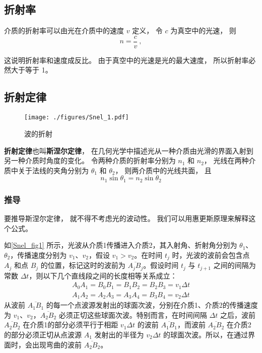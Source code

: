 
\subsection{折射率}
介质的折射率可以由光在介质中的速度 $v$ 定义， 令 $c$ 为真空中的光速， 则
\begin{equation}
n = \frac{c}{v}~,
\end{equation} 

这说明折射率和速度成反比。 由于真空中的光速是光的最大速度， 所以折射率必然大于等于 1。

\subsection{折射定律}
\begin{figure}[ht]
\centering
\texttt{[image: ./figures/Snel\_1.pdf]}
\caption{波的折射} \label{Snel_fig1}
\end{figure}
\textbf{折射定律}也叫\textbf{斯涅尔定律}， 在几何光学中描述光从一种介质由光滑的界面入射到另一种介质时角度的变化。 令两种介质的折射率分别为 $n_1$ 和 $n_2$， 光线在两种介质中关于法线的夹角分别为 $\theta_1$ 和 $\theta_2$， 则两介质中的光线共面， 且
\begin{equation}
n_1 \sin\theta_1 = n_2 \sin\theta_2
\end{equation}


\subsubsection{推导}
要推导斯涅尔定律， 就不得不考虑光的波动性。 我们可以用惠更斯原理来解释这个公式。

如\autoref{Snel_fig1} 所示，光波从介质1传播进入介质2，其入射角、折射角分别为 $\theta_1$、$\theta_2$，传播速度分别为 $v_1$、$v_2$，假设 $v_1>v_2$。在时间 $t_{j}$ 时，光波的波前会包含点 $A_{j}$ 和点 $B_{j}$ 的位置，标记这时的波前为 $\overline {A_{j}B_{j}}$。假设时间 $t_{j}$ 与 $t_{{j+1}}$ 之间的间隔为常数 $\Delta t$，则以下几个直线段之间的长度相等关系成立：
\begin{equation}
\begin{aligned}
A_{0}A_{1}=B_{0}B_{1}=B_{1}B_{2}=B_{2}B_{3}=v_{1}\Delta t \\
A_{1}A_{2}=A_{2}A_{3}=A_{3}A_{4}=B_{3}B_{4}=v_{2}\Delta t
\end{aligned}
\end{equation}
从波前 $\overline {A_{1}B_{1}}$ 的每一个点波源发射出的球面次波，分别在介质1、介质2的传播速度为 $v_1$、$v_2$，$\overline {A_{2}B_{2}}$ 必须正切这些球面次波。特别而言，在时间间隔 $\Delta t$ 之后，波前 $\overline {A_{2}B_{2}}$ 在介质1的部分必须平行于相距 $v_{1}\Delta t$ 的波前 $\overline {A_{1}B_{1}}$，而波前 $\overline {A_{2}B_{2}}$ 在介质2的部分必须正切从点波源 $A_{1}$ 发射出的半径为 $v_{2}\Delta t$ 的球面次波。所以，在通过界面时，会出现弯曲的波前 $\overline {A_{2}B_{2}}$。

